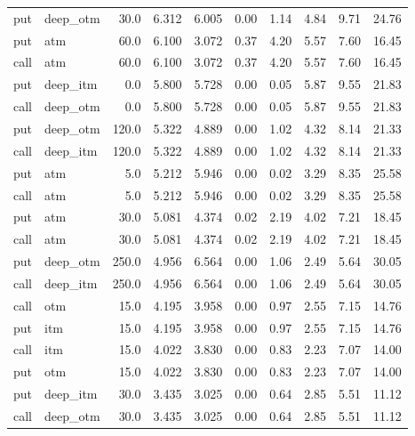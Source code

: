 \begin{longtable}{llrrrrrrrr}
  put &  deep\_otm &      30.0 &  6.312 &  6.005 &    0.00 &    1.14 &   4.84 &    9.71 &   24.76 \\
  put &       atm &      60.0 &  6.100 &  3.072 &    0.37 &    4.20 &   5.57 &    7.60 &   16.45 \\
 call &       atm &      60.0 &  6.100 &  3.072 &    0.37 &    4.20 &   5.57 &    7.60 &   16.45 \\
  put &  deep\_itm &       0.0 &  5.800 &  5.728 &    0.00 &    0.05 &   5.87 &    9.55 &   21.83 \\
 call &  deep\_otm &       0.0 &  5.800 &  5.728 &    0.00 &    0.05 &   5.87 &    9.55 &   21.83 \\
  put &  deep\_otm &     120.0 &  5.322 &  4.889 &    0.00 &    1.02 &   4.32 &    8.14 &   21.33 \\
 call &  deep\_itm &     120.0 &  5.322 &  4.889 &    0.00 &    1.02 &   4.32 &    8.14 &   21.33 \\
  put &       atm &       5.0 &  5.212 &  5.946 &    0.00 &    0.02 &   3.29 &    8.35 &   25.58 \\
 call &       atm &       5.0 &  5.212 &  5.946 &    0.00 &    0.02 &   3.29 &    8.35 &   25.58 \\
  put &       atm &      30.0 &  5.081 &  4.374 &    0.02 &    2.19 &   4.02 &    7.21 &   18.45 \\
 call &       atm &      30.0 &  5.081 &  4.374 &    0.02 &    2.19 &   4.02 &    7.21 &   18.45 \\
  put &  deep\_otm &     250.0 &  4.956 &  6.564 &    0.00 &    1.06 &   2.49 &    5.64 &   30.05 \\
 call &  deep\_itm &     250.0 &  4.956 &  6.564 &    0.00 &    1.06 &   2.49 &    5.64 &   30.05 \\
 call &       otm &      15.0 &  4.195 &  3.958 &    0.00 &    0.97 &   2.55 &    7.15 &   14.76 \\
  put &       itm &      15.0 &  4.195 &  3.958 &    0.00 &    0.97 &   2.55 &    7.15 &   14.76 \\
 call &       itm &      15.0 &  4.022 &  3.830 &    0.00 &    0.83 &   2.23 &    7.07 &   14.00 \\
  put &       otm &      15.0 &  4.022 &  3.830 &    0.00 &    0.83 &   2.23 &    7.07 &   14.00 \\
  put &  deep\_itm &      30.0 &  3.435 &  3.025 &    0.00 &    0.64 &   2.85 &    5.51 &   11.12 \\
 call &  deep\_otm &      30.0 &  3.435 &  3.025 &    0.00 &    0.64 &   2.85 &    5.51 &   11.12 \\

\end{longtable}
